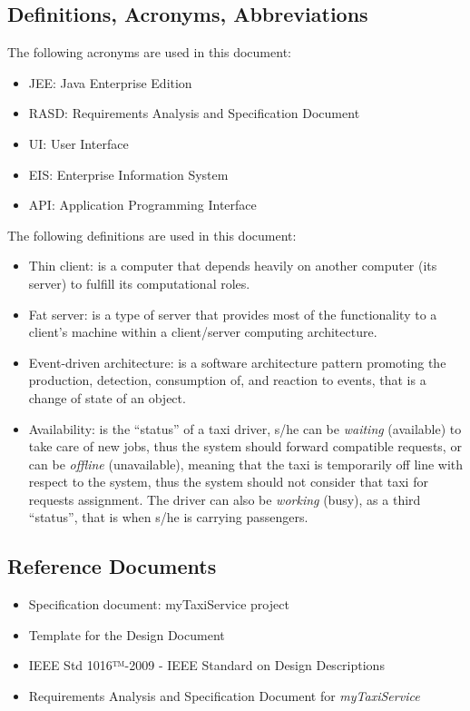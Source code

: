 \documentclass[a4paper,11pt]{report} %
\newcommand{\mts}{\mbox{\normalfont\itshape myTaxiService}}
\begin{document}
	\subsection{Definitions, Acronyms, Abbreviations}
	The following acronyms are used in this document:
	\begin{itemize}
		\item JEE: Java Enterprise Edition
		\item RASD: Requirements Analysis and Specification Document
		\item UI: User Interface
		\item EIS: Enterprise Information System
		\item API: Application Programming Interface
	\end{itemize}
	The following definitions are used in this document:
	\begin{itemize}
		\item Thin client: is a computer that depends heavily on another computer (its server) to fulfill its computational roles.
		\item Fat server: is a type of server that provides most of the functionality to a client's machine within a client/server computing architecture.
		\item Event-driven architecture:  is a software architecture pattern promoting the production, detection, consumption of, and reaction to events, that is a change of state of an object.
		\item Availability: is the ``status'' of a taxi driver, s/he can be \textit{waiting} (available) to take care of new jobs, thus the system should forward compatible requests, or can be \textit{offline} (unavailable), meaning that the taxi is temporarily off line with respect to the system, thus the system should not consider that taxi for requests assignment. The driver can also be \textit{working} (busy), as a third ``status'', that is when s/he is carrying passengers.
	\end{itemize}
	
	\subsection{Reference Documents}
	\begin{itemize}
		\item Specification document: myTaxiService project
		\item Template for the Design Document
		\item IEEE Std 1016™-2009 - IEEE Standard on Design Descriptions
		\item Requirements Analysis and Specification Document for \mts{}
	\end{itemize}
	
\end{document}
